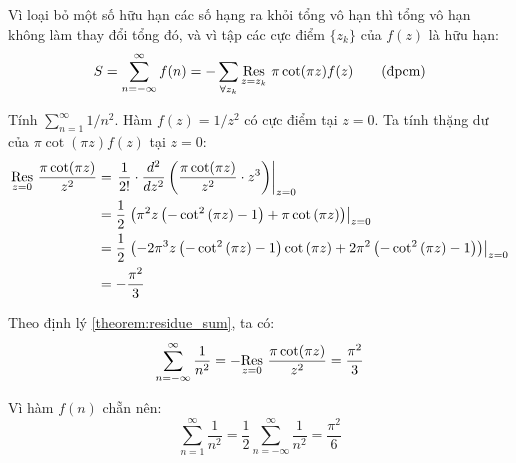 Vì loại bỏ một số hữu hạn các số hạng ra khỏi tổng vô hạn thì tổng vô hạn không làm thay đổi tổng đó, và vì tập các cực điểm $\{z_k\}$ của $f(z)$ là hữu hạn:
\begin{equation}
	S = \sum_{n=-\infty}^{\infty} f(n) = -\sum_{\forall z_k} \Res{\pi\cot(\pi z)f(z)}{z=z_k} \tag{đpcm}
\end{equation}

\begin{example}
	Tính $\sum_{n=1}^\infty 1/n^2$. Hàm $f(z) = 1/z^2$ có cực điểm tại $z=0$. Ta tính thặng dư của $\pi \cot(\pi z) f(z)$ tại $z=0$:
	\begin{align*}
		\Res{\frac{\pi \cot(\pi z)}{z^2}}{z=0} 
		&= \left.\frac{1}{2!}\cdot\frac{d^2}{dz^2}\left(\frac{\pi \cot(\pi z)}{z^2}\cdot z^3 \right) \right\rvert_{z=0}\\
		&= \frac 1 2 \left.\left(\pi^{2} z \left(- \cot^{2}{\left(\pi z \right)} - 1\right) + \pi \cot{\left(\pi z \right)}
		\right)\right\rvert_{z=0}\\ 
		&= \frac 1 2 \left.\left(- 2 \pi^{3} z \left(- \cot^{2}{\left(\pi z \right)} - 1\right) \cot{\left(\pi z \right)} + 2 \pi^{2} \left(- \cot^{2}{\left(\pi z \right)} - 1\right)\right)\right\rvert_{z=0}\\
		&= - \frac{ \pi^{2}}{3}
	\end{align*}
\end{example}

Theo định lý \ref{theorem:residue_sum}, ta có:
\begin{equation*}
	 \sum_{n=-\infty}^{\infty} \frac{1}{n^2}=-\Res{\frac{\pi \cot(\pi z)}{z^2}}{z=0}  = \frac{\pi^2}3
\end{equation*}

Vì hàm $f(n)$ chẵn nên:
\begin{equation*}
	\sum_{n=1}^\infty \frac 1 {n^2} = \frac{1}{2}\sum_{n=-\infty}^{\infty} \frac{1}{n^2} = \frac{\pi^2}{6}
\end{equation*}
